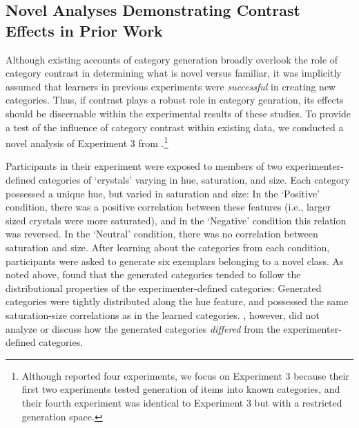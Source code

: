 \documentclass[12pt]{article}
\begin{document}
\begin{flushleft}
\subsection{Novel Analyses Demonstrating Contrast Effects in Prior Work}

Although existing accounts of category generation broadly overlook the role of category contrast in determining what is novel versus familiar, it was implicitly assumed that learners in previous experiments were {\em successful} in creating new categories. Thus, if contrast plays a robust role in category genration, its effects should be discernable within the experimental results of these studies. To provide a test of the influence of category contrast within existing data, we conducted a novel analysis of Experiment 3 from \cite{jern2013probabilistic}.\footnote{Although \cite{jern2013probabilistic} reported four experiments, we focus on Experiment 3 because their first two experiments tested generation of items into known categories, and their fourth experiment was identical to Experiment 3 but with a restricted generation space.}

Participants in their experiment were exposed to members of two experimenter-defined categories of `crystals' varying in hue, saturation, and size. Each category possessed a unique hue, but varied in saturation and size: In the `Positive' condition, there was a positive correlation between these features (i.e., larger sized crystals were more saturated), and in the `Negative' condition this relation was reversed. In the `Neutral' condition, there was no correlation between saturation and size. After learning about the categories from each condition, participants were asked to generate six exemplars belonging to a novel class. As noted above, \cite{jern2013probabilistic} found that the generated categories tended to follow the distributional properties of the experimenter-defined categories: Generated categories were tightly distributed along the hue feature, and possessed the same saturation-size correlations as in the learned categories. \cite{jern2013probabilistic}, however, did not analyze or discuss how the generated categories {\em differed} from the experimenter-defined categories. 


\end{flushleft}
\end{document}
